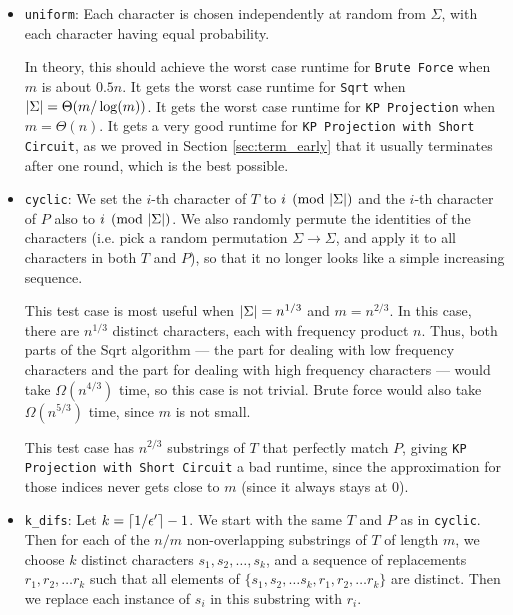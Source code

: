 \documentclass{article}
\theoremstyle{definition}
\newcommand{\eps}{\epsilon}
\DeclarePairedDelimiter{\ceil}{\lceil}{\rceil}
\DeclarePairedDelimiter{\abs}{\lvert}{\rvert}
\begin{document}
\begin{itemize}
    \item \texttt{uniform}:
    Each character is chosen independently at random from $\Sigma$, with each character having equal probability.
    
    In theory, this should achieve the worst case runtime for \texttt{Brute Force} when $m$ is about $0.5n$.
    It gets the worst case runtime for \texttt{Sqrt} when $\abs{\Sigma} = \Theta(m/\log(m))$.
    It gets the worst case runtime for \texttt{KP Projection} when $m = \Theta(n)$.
    It gets a very good runtime for \texttt{KP Projection with Short Circuit}, as we proved in Section \ref{sec:term_early} that it usually terminates after one round, which is the best possible.

    \item \texttt{cyclic}:
    We set the $i$-th character of $T$ to $i \pmod{\abs{\Sigma}}$ and the $i$-th character of $P$ also to $i \pmod{\abs{\Sigma}}$.
    We also randomly permute the identities of the characters (i.e. pick a random permutation $\Sigma \to \Sigma$, and apply it to all characters in both $T$ and $P$), so that it no longer looks like a simple increasing sequence.
    
    This test case is most useful when $\abs{\Sigma} = n^{1/3}$ and $m = n^{2/3}$.
    In this case, there are $n^{1/3}$ distinct characters, each with frequency product $n$.
    Thus, both parts of the Sqrt algorithm --- the part for dealing with low frequency characters and the part for dealing with high frequency characters --- would take $\Omega(n^{4/3})$ time, so this case is not trivial.
    Brute force would also take $\Omega(n^{5/3})$ time, since $m$ is not small.

    This test case has $n^{2/3}$ substrings of $T$ that perfectly match $P$, giving \texttt{KP Projection with Short Circuit} a bad runtime, since the approximation for those indices never gets close to $m$ (since it always stays at $0$).

    \item \texttt{k\_difs}:
    Let $k = \ceil{1/\eps'} - 1$.
    We start with the same $T$ and $P$ as in \texttt{cyclic}.
    Then for each of the $n/m$ non-overlapping substrings of $T$ of length $m$, we choose $k$ distinct characters $s_1, s_2, \ldots, s_k$, and a sequence of replacements $r_1, r_2, \ldots r_k$ such that all elements of $\{s_1, s_2, \ldots s_k, r_1, r_2, \ldots r_k\}$ are distinct.
    Then we replace each instance of $s_i$ in this substring with $r_i$.


\end{itemize}
\end{document}
